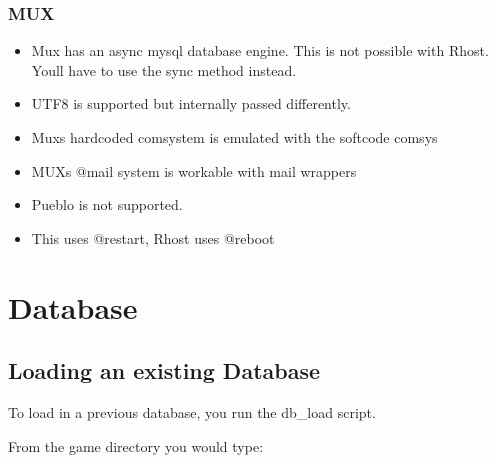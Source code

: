 \documentclass[letterpaper,10pt,english]{sphinxmanual}
\begin{document}
\subsection{MUX}
\label{\detokenize{differences:mux}}\begin{itemize}
\item {} 
\sphinxAtStartPar
Mux has an async mysql database engine.  This is not possible with Rhost.  You\textquotesingle{}ll have to use the sync method instead.

\item {} 
\sphinxAtStartPar
UTF8 is supported but internally passed differently.

\item {} 
\sphinxAtStartPar
Mux\textquotesingle{}s hardcoded comsystem is emulated with the softcode comsys

\item {} 
\sphinxAtStartPar
MUX\textquotesingle{}s @mail system is workable with mail wrappers

\item {} 
\sphinxAtStartPar
Pueblo is not supported.

\item {} 
\sphinxAtStartPar
This uses @restart, Rhost uses @reboot

\end{itemize}


\chapter{Database}
\label{\detokenize{database:database}}\label{\detokenize{database::doc}}

\section{Loading an existing Database}
\label{\detokenize{database:loading-an-existing-database}}
\sphinxAtStartPar
To load in a previous database, you run the db\_load script.

\sphinxAtStartPar
From the game directory you would type:

\begin{sphinxVerbatim}[commandchars=\\\{\}]
   
\end{sphinxVerbatim}
\end{document}
